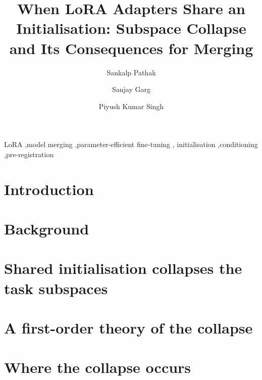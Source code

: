\documentclass[preprint,12pt,number,sort&compress]{elsarticle}
\begin{document}
\begin{frontmatter}

\title{When LoRA Adapters Share an Initialisation: Subspace Collapse and Its
Consequences for Merging}

\author[jiet]{Sankalp Pathak}
\author[jiet]{Sanjay Garg}
\author[jiet]{Piyush Kumar Singh}

\begin{abstract}

\end{abstract}

\begin{highlights}

\end{highlights}

\begin{keyword}
LoRA \sep model merging \sep parameter-efficient fine-tuning \sep
initialisation \sep conditioning \sep pre-registration
\end{keyword}

\end{frontmatter}

\section{Introduction}\label{sec:intro}


\section{Background}\label{sec:background}


\section{Shared initialisation collapses the task subspaces}\label{sec:collapse}


\section{A first-order theory of the collapse}\label{sec:theory}


\section{Where the collapse occurs}\label{sec:prevalence}

\end{document}
